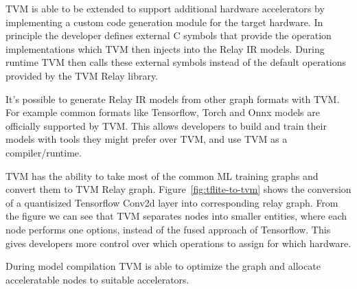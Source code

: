 \documentclass[12pt,a4paper,english
]{tunithesis}
\begin{document}
TVM is able to be extended to support additional hardware accelerators by implementing a custom code generation module for the target hardware. In principle the developer defines external C symbols that provide the operation implementations which TVM then injects into the Relay IR models. During runtime TVM then calls these external symbols instead of the default operations provided by the TVM Relay library.

It's possible to generate Relay IR models from other graph formats with TVM. For example common formats like Tensorflow, Torch and Onnx models are officially supported by TVM. This allows developers to build and train their models with tools they might prefer over TVM, and use TVM as a compiler/runtime.

TVM has the ability to take most of the common ML training graphs and convert them to TVM Relay graph. Figure~\ref{fig:tflite-to-tvm} shows the conversion of a quantisized Tensorflow Conv2d layer into corresponding relay graph. From the figure we can see that TVM separates nodes into smaller entities, where each node performs one options, instead of the fused approach of Tensorflow. This gives developers more control over which operations to assign for which hardware.

During model compilation TVM is able to optimize the graph and allocate acceleratable nodes to suitable accelerators.~\parencite{TVM}
\end{document}
